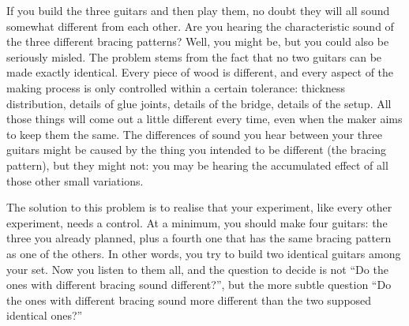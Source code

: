   If you build the three guitars and then play them, no doubt they will all 
  sound somewhat different from each other. Are you hearing the characteristic 
  sound of the three different bracing patterns? Well, you might be, but you 
  could also be seriously misled. The problem stems from the fact that no two 
  guitars can be made exactly identical. Every piece of wood is different, and 
  every aspect of the making process is only controlled within a certain 
  tolerance: thickness distribution, details of glue joints, details of the 
  bridge, details of the setup. All those things will come out a little 
  different every time, even when the maker aims to keep them the same. The 
  differences of sound you hear between your three guitars might be caused by 
  the thing you intended to be different (the bracing pattern), but they might 
  not: you may be hearing the accumulated effect of all those other small 
  variations. 

  The solution to this problem is to realise that your experiment, like every 
  other experiment, needs a control. At a minimum, you should make four 
  guitars: the three you already planned, plus a fourth one that has the same 
  bracing pattern as one of the others. In other words, you try to build two 
  identical guitars among your set. Now you listen to them all, and the 
  question to decide is not “Do the ones with different bracing sound 
  different?”, but the more subtle question “Do the ones with different bracing 
  sound more different than the two supposed identical ones?” 

